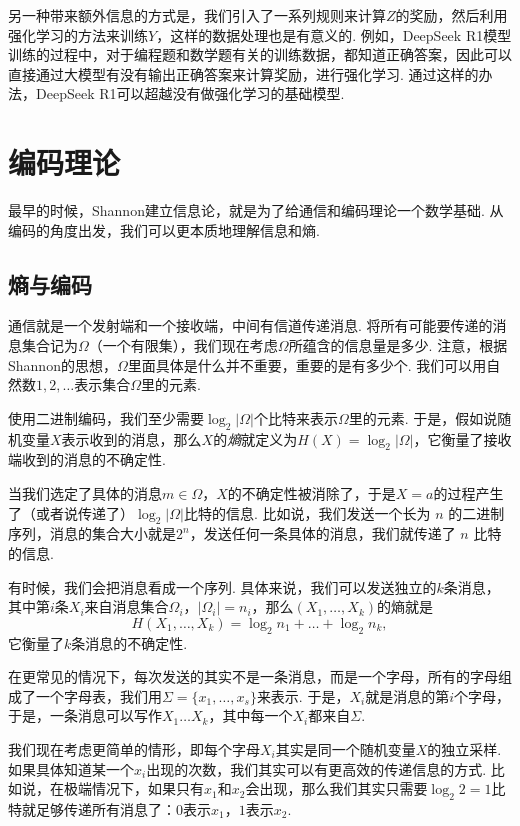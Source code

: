 另一种带来额外信息的方式是，我们引入了一系列规则来计算$Z$的奖励，然后利用强化学习的方法来训练$Y$，这样的数据处理也是有意义的. 例如，DeepSeek R1模型训练的过程中，对于编程题和数学题有关的训练数据，都知道正确答案，因此可以直接通过大模型有没有输出正确答案来计算奖励，进行强化学习. 通过这样的办法，DeepSeek R1可以超越没有做强化学习的基础模型. 

\section{编码理论}\label{sec:entropy-and-communication}
最早的时候，Shannon建立信息论，就是为了给通信和编码理论一个数学基础. 从编码的角度出发，我们可以更本质地理解信息和熵. 

\subsection{熵与编码}

通信就是一个发射端和一个接收端，中间有信道传递消息. 将所有可能要传递的消息集合记为$\Omega$（一个有限集），我们现在考虑$\Omega$所蕴含的信息量是多少. 注意，根据Shannon的思想，$\Omega$里面具体是什么并不重要，重要的是有多少个. 我们可以用自然数$1,2,\dots$表示集合$\Omega$里的元素. 

使用二进制编码，我们至少需要$\log_2 |\Omega|$个比特来表示$\Omega$里的元素. 于是，假如说随机变量$X$表示收到的消息，那么$X$的\textit{熵}就定义为$H(X)=\log_2 |\Omega|$，它衡量了接收端收到的消息的不确定性. 

当我们选定了具体的消息$m\in \Omega$，$X$的不确定性被消除了，于是$X=a$的过程产生了（或者说传递了）$\log_2 |\Omega|$比特的信息. 比如说，我们发送一个长为 $n$ 的二进制序列，消息的集合大小就是$2^n$，发送任何一条具体的消息，我们就传递了 $n$ 比特的信息.

有时候，我们会把消息看成一个序列. 具体来说，我们可以发送独立的$k$条消息，其中第$i$条$X_i$来自消息集合$\Omega_i$，$|\Omega_i|=n_i$，那么$(X_1,\dots,X_k)$的熵就是
\[H(X_1,\dots,X_k)=\log_2 n_1+\dots+\log_2 n_k,\]
它衡量了$k$条消息的不确定性. 

在更常见的情况下，每次发送的其实不是一条消息，而是一个字母，所有的字母组成了一个字母表，我们用$\Sigma=\{x_1,\dots,x_s\}$来表示. 于是，$X_i$就是消息的第$i$个字母，于是，一条消息可以写作$X_1\dots X_k$，其中每一个$X_i$都来自$\Sigma$.

我们现在考虑更简单的情形，即每个字母$X_i$其实是同一个随机变量$X$的独立采样. 如果具体知道某一个$x_i$出现的次数，我们其实可以有更高效的传递信息的方式. 比如说，在极端情况下，如果只有$x_1$和$x_2$会出现，那么我们其实只需要$\log_2 2=1$比特就足够传递所有消息了：$0$表示$x_1$，$1$表示$x_2$.

